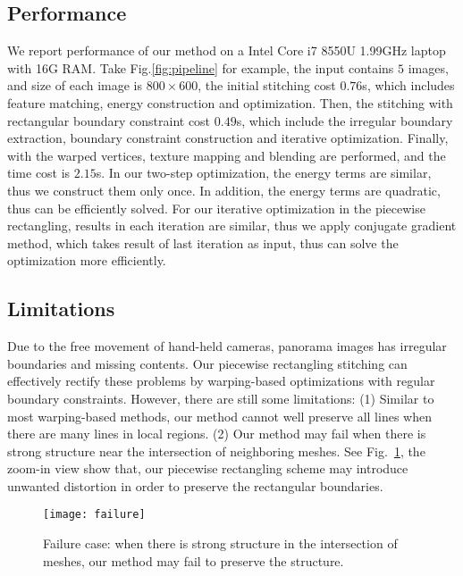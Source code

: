 \documentclass[10pt,journal,compsoc]{IEEEtran}
\begin{document}
 \subsection{Performance}
We report performance of our method on a Intel Core i7 8550U 1.99GHz laptop with 16G RAM. Take Fig.\ref{fig:pipeline} for example, the input contains $5$ images, and size of each image is $800\times600$, the initial stitching cost $0.76$s, which includes feature matching, energy construction and optimization.
Then, the stitching with rectangular boundary constraint cost $0.49$s, which include the irregular boundary extraction, boundary constraint construction and iterative optimization. Finally, with the warped vertices, texture mapping and blending are performed, and the time cost is $2.15$s.
In our two-step optimization, the energy terms are similar, thus we construct them only once. In addition, the energy terms are quadratic, thus can be efficiently solved.
For our iterative optimization in the piecewise rectangling, results in each iteration are similar, thus we apply conjugate gradient method, which takes result of last iteration as input, thus can solve the optimization more efficiently.

  \subsection{Limitations}
Due to the free movement of hand-held cameras, panorama images has irregular boundaries and missing contents.
Our piecewise rectangling stitching can effectively rectify these problems by warping-based optimizations with regular boundary constraints.
However, there are still some limitations:
(1) Similar to most warping-based methods, our method cannot well preserve all lines when there are many lines in local regions.
(2) Our method may fail when there is strong structure near the intersection of neighboring meshes. See Fig.~\ref{fig:failure}, the zoom-in view show that, our piecewise rectangling scheme may introduce unwanted distortion in order to preserve the rectangular boundaries.

 \begin{figure} %
  \centering
  \texttt{[image: failure]}
  \caption{Failure case: when there is strong structure in the intersection of meshes, our method may fail to preserve the structure.} \label{fig:failure}
\end{figure}
\end{document}
